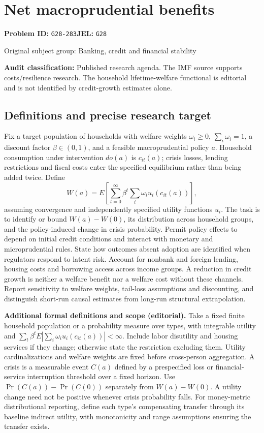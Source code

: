 \documentclass[11pt,a4paper]{article}
\begin{document}
\section*{Net macroprudential benefits}
\textbf{Problem ID:} \texttt{G28-283}\quad \textbf{JEL:} \texttt{G28}\par
\label{problem:OP-0324}
{\sffamily\small\color{muted}Original subject group: Banking, credit and financial stability\par}
\label{definitions:problem:30007606}
\textbf{Audit classification:} Published research agenda. The IMF source supports costs/resilience research. The household lifetime-welfare functional is editorial and is not identified by credit-growth estimates alone.
\subsection*{Definitions and precise research target}
Fix a target population of households with welfare weights \(\omega_i\geq0\), \(\sum_i\omega_i=1\), a discount factor \(\beta\in(0,1)\), and a feasible macroprudential policy \(a\). Household consumption under intervention \(do(a)\) is \(c_{it}(a)\); crisis losses, lending restrictions and fiscal costs enter the specified equilibrium rather than being added twice. Define
\[W(a)=E\left[\sum_{t=0}^{\infty}\beta^t\sum_i\omega_i u_i(c_{it}(a))\right],\]
assuming convergence and independently specified utility functions \(u_i\). The task is to identify or bound \(W(a)-W(0)\), its distribution across household groups, and the policy-induced change in crisis probability. Permit policy effects to depend on initial credit conditions and interact with monetary and microprudential rules. State how outcomes absent adoption are identified when regulators respond to latent risk. Account for nonbank and foreign lending, housing costs and borrowing access across income groups. A reduction in credit growth is neither a welfare benefit nor a welfare cost without these channels. Report sensitivity to welfare weights, tail-loss assumptions and discounting, and distinguish short-run causal estimates from long-run structural extrapolation.

\textbf{Additional formal definitions and scope (editorial).} Take a fixed finite household population or a probability measure over types, with integrable utility and \(\sum_t\beta^t E|\sum_i\omega_i u_i(c_{it}(a))|<\infty\). Include labor disutility and housing services if they change; otherwise state the restriction excluding them. Utility cardinalizations and welfare weights are fixed before cross-person aggregation. A crisis is a measurable event \(C(a)\) defined by a prespecified loss or financial-service interruption threshold over a fixed horizon. Use \(\Pr(C(a))-\Pr(C(0))\) separately from \(W(a)-W(0)\). A utility change need not be positive whenever crisis probability falls. For money-metric distributional reporting, define each type's compensating transfer through its baseline indirect utility, with monotonicity and range assumptions ensuring the transfer exists.
\end{document}
